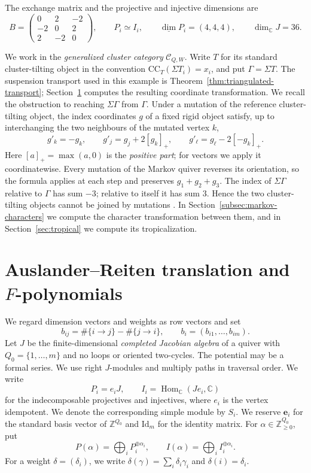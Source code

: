 \documentclass[11pt]{amsart}
\numberwithin{equation}{section}
\theoremstyle{definition}
\theoremstyle{remark}
\newcommand{\op}[1]{\operatorname{#1}}
\newcommand{\CC}{\mathrm{CC}}
\newcommand{\ZZ}{\mathbb Z}
\newcommand{\Hom}{\op{Hom}}
\newcommand{\dv}{\underline{\dim}}
\begin{document}
The exchange matrix and the projective and injective dimensions are
\[ B=\begin{pmatrix}0&2&-2\\-2&0&2\\2&-2&0\end{pmatrix},\qquad P_i\simeq I_i,\qquad \dv P_i=(4,4,4),\qquad \dim_{\mathbb C}J=36. \]

We work in the \emph{generalized cluster category} $\mathcal C_{Q,W}$.
Write $T$ for its standard cluster-tilting object in the convention
$\CC_T(\Sigma T_i)=x_i$, and put $\Gamma=\Sigma T$.
The suspension transport used in this example is
Theorem~\ref{thm:triangulated-transport}; Section~\ref{sec:AR}
computes the resulting coordinate transformation.
We recall the obstruction to reaching $\Sigma\Gamma$ from $\Gamma$.
Under a mutation of the reference cluster-tilting object, the index
coordinates $g$ of a fixed rigid object satisfy, up to interchanging the
two neighbours of the mutated vertex $k$,
\[ g'_k=-g_k,\qquad g'_j=g_j+2[g_k]_+,\qquad g'_\ell=g_\ell-2[-g_k]_+. \]
Here $[a]_+=\max(a,0)$ is the \emph{positive part}; for vectors we
apply it coordinatewise. Every mutation of the Markov quiver reverses
its orientation, so the formula applies at each step and preserves
$g_1+g_2+g_3$.
The index of $\Sigma\Gamma$ relative to $\Gamma$ has sum $-3$;
relative to itself it has sum $3$. Hence the two cluster-tilting objects
cannot be joined by mutations \cite[Example~4.3]{Pla13}.
In Section~\ref{subsec:markov-characters} we compute the character
transformation between them, and in Section~\ref{sec:tropical} we compute
its tropicalization.

\section{Auslander--Reiten translation and \texorpdfstring{$F$}{F}-polynomials}\label{sec:AR}

We regard dimension vectors and weights as row vectors and set
\[ b_{ij}=\#\{i\to j\}-\#\{j\to i\},\qquad b_i=(b_{i1},\ldots,b_{im}). \]
Let $J$ be the finite-dimensional \emph{completed Jacobian algebra}
of a quiver with $Q_0=\{1,\ldots,m\}$ and no loops or oriented
two-cycles. The potential may be a formal series. We use right
$J$-modules and multiply paths in traversal order. We write
\[ P_i=e_iJ,\qquad I_i=\Hom_{\mathbb C}(Je_i,\mathbb C) \]
for the indecomposable projectives and injectives, where $e_i$ is the
vertex idempotent. We denote the corresponding simple module by $S_i$.
We reserve $\mathbf e_i$ for the standard basis
vector of $\ZZ^{Q_0}$ and $\mathrm{Id}_m$ for the identity matrix. For $\alpha\in\ZZ_{\geq0}^{Q_0}$, put
\[ P(\alpha)=\bigoplus_i P_i^{\oplus\alpha_i},\qquad I(\alpha)=\bigoplus_i I_i^{\oplus\alpha_i}. \]
For a weight $\delta=(\delta_i)$, we write
$\delta(\gamma)=\sum_i\delta_i\gamma_i$ and $\delta(i)=\delta_i$.
\end{document}
